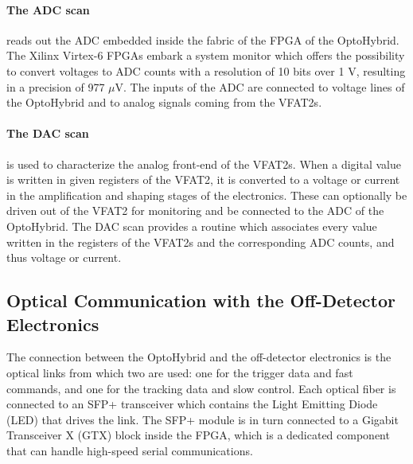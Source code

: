       \paragraph{The ADC scan} reads out the ADC embedded inside the fabric of the FPGA of the OptoHybrid. The Xilinx Virtex-6 FPGAs embark a system monitor \cite{VIRTEX-SYSMON} which offers the possibility to convert voltages to ADC counts with a resolution of 10 bits over 1 V, resulting in a precision of 977 $\mu$V. The inputs of the ADC are connected to voltage lines of the OptoHybrid and to analog signals coming from the VFAT2s.

      \paragraph{The DAC scan} is used to characterize the analog front-end of the VFAT2s. When a digital value is written in given registers of the VFAT2, it is converted to a voltage or current in the amplification and shaping stages of the electronics. These can optionally be driven out of the VFAT2 for monitoring and be connected to the ADC of the OptoHybrid. The DAC scan provides a routine which associates every value written in the registers of the VFAT2s and the corresponding ADC counts, and thus voltage or current.

    \subsection{Optical Communication with the Off-Detector Electronics}

      The connection between the OptoHybrid and the off-detector electronics is the optical links from which two are used: one for the trigger data and fast commands, and one for the tracking data and slow control. Each optical fiber is connected to an SFP+ transceiver which contains the Light Emitting Diode (LED) that drives the link. The SFP+ module is in turn connected to a Gigabit Transceiver X (GTX) block inside the FPGA, which is a dedicated component that can handle high-speed serial communications.

